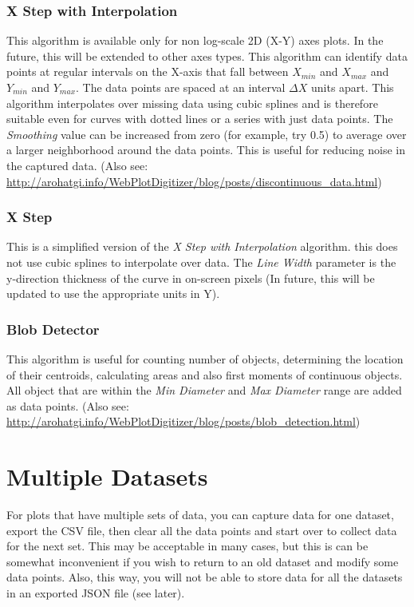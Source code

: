 \documentclass[letterpaper, 10pt]{article}
\begin{document}
\subsubsection{X Step with Interpolation}
This algorithm is available only for non log-scale 2D (X-Y) axes plots. In the future, this will be extended to other axes types. This algorithm can identify data points at regular intervals on the X-axis that fall between $X_{min}$ and $X_{max}$ and $Y_{min}$ and $Y_{max}$. The data points are spaced at an interval $\Delta X$ units apart. This algorithm interpolates over missing data using cubic splines and is therefore suitable even for curves with dotted lines or a series with just data points. The \emph{Smoothing} value can be increased from zero (for example, try 0.5) to average over a larger neighborhood around the data points. This is useful for reducing noise in the captured data. (Also see: \url{http://arohatgi.info/WebPlotDigitizer/blog/posts/discontinuous_data.html})

\subsubsection{X Step}
This is a simplified version of the \emph{X Step with Interpolation} algorithm. this does not use cubic splines to interpolate over data. The \emph{Line Width} parameter is the y-direction thickness of the curve in on-screen pixels (In future, this will be updated to use the appropriate units in Y). 

\subsubsection{Blob Detector}
This algorithm is useful for counting number of objects, determining the location of their centroids, calculating areas and also first moments of continuous objects. All object that are within the \emph{Min Diameter} and \emph{Max Diameter} range are added as data points. (Also see: \url{http://arohatgi.info/WebPlotDigitizer/blog/posts/blob_detection.html})

\section{Multiple Datasets}
For plots that have multiple sets of data, you can capture data for one dataset, export the CSV file, then clear all the data points and start over to collect data for the next set. This may be acceptable in many cases, but this is can be somewhat inconvenient if you wish to return to an old dataset and modify some data points. Also, this way, you will not be able to store data for all the datasets in an exported JSON file (see later). 
\end{document}
